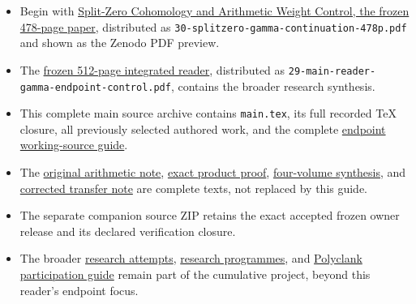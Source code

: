 \documentclass[
]{article}
\providecommand{\tightlist}{%
  \setlength{\itemsep}{0pt}\setlength{\parskip}{0pt}}
\begin{document}
\begin{itemize}
\tightlist
\item
  Begin with
  \href{https://github.com/KokunoYumeto/zeta-function-research-reader/blob/0e11075765b6e0f4de2beb7d392e2ace94df0ffa/workbenches/splitzero-tandem/continuations/20260913-gamma/Split_Zero_Cohomology_and_Arithmetic_Weight_Control.pdf}{Split-Zero
  Cohomology and Arithmetic Weight Control, the frozen 478-page paper},
  distributed as \texttt{30-splitzero-gamma-continuation-478p.pdf} and
  shown as the Zenodo PDF preview.
\item
  The
  \href{https://github.com/KokunoYumeto/zeta-function-research-reader/blob/main/reader.pdf}{frozen
  512-page integrated reader}, distributed as
  \texttt{29-main-reader-gamma-endpoint-control.pdf}, contains the
  broader research synthesis.
\item
  This complete main source archive contains \texttt{main.tex}, its full
  recorded TeX closure, all previously selected authored work, and the
  complete
  \href{https://github.com/KokunoYumeto/zeta-function-research-reader/blob/952ef9fee1e1419b6858d920354de8fa99430b7d/workbenches/tau-arithmetic-endpoint-bounds/README.md}{endpoint
  working-source guide}.
\item
  The
  \href{https://github.com/KokunoYumeto/zeta-function-research-reader/blob/952ef9fee1e1419b6858d920354de8fa99430b7d/workbenches/tau-arithmetic-endpoint-bounds/delivery/RESEARCH_NOTE.md}{original
  arithmetic note},
  \href{https://github.com/KokunoYumeto/zeta-function-research-reader/blob/952ef9fee1e1419b6858d920354de8fa99430b7d/workbenches/tau-arithmetic-endpoint-bounds/window/WINDOW_PRODUCT_PROOF.md}{exact
  product proof},
  \href{https://github.com/KokunoYumeto/zeta-function-research-reader/blob/952ef9fee1e1419b6858d920354de8fa99430b7d/workbenches/tau-arithmetic-endpoint-bounds/FOUR_VOLUME_THRESHOLD.md}{four-volume
  synthesis}, and
  \href{https://github.com/KokunoYumeto/zeta-function-research-reader/blob/952ef9fee1e1419b6858d920354de8fa99430b7d/workbenches/tau-confluent-transfer/RESEARCH_NOTE.md}{corrected
  transfer note} are complete texts, not replaced by this guide.
\item
  The separate companion source ZIP retains the exact accepted frozen
  owner release and its declared verification closure.
\item
  The broader
  \href{https://github.com/KokunoYumeto/zeta-function-research-reader/blob/952ef9fee1e1419b6858d920354de8fa99430b7d/ATTEMPTS.md}{research
  attempts},
  \href{https://github.com/KokunoYumeto/zeta-function-research-reader/blob/952ef9fee1e1419b6858d920354de8fa99430b7d/RESEARCH_PROGRAMMES.md}{research
  programmes}, and
  \href{https://github.com/KokunoYumeto/zeta-function-research-reader/blob/952ef9fee1e1419b6858d920354de8fa99430b7d/POLYCLANK_PARTICIPATION.md}{Polyclank
  participation guide} remain part of the cumulative project, beyond
  this reader's endpoint focus.
\end{itemize}
\end{document}
